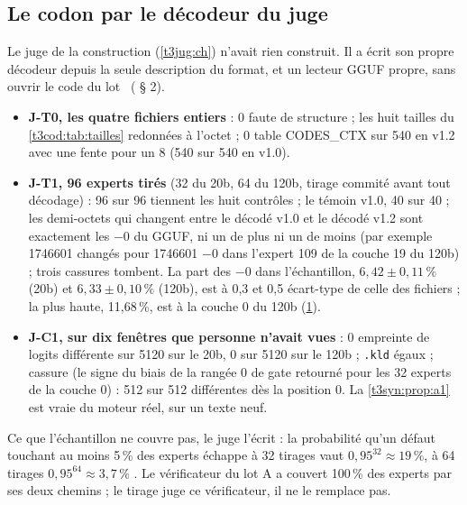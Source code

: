 \subsection{Le codon par le décodeur du juge}

Le juge de la construction (\cref{t3jug:ch}) n'avait rien construit. Il a écrit son propre décodeur depuis la seule description du format, et un lecteur GGUF propre, sans ouvrir le code du lot \mes~( § 2).

\begin{figure}[tbp]
\centering
\GrapheJconsCodon
{}
\label{fig:t3-jcons-codon}
\end{figure}

\begin{itemize}
\item \textbf{J-T0, les quatre fichiers entiers} : 0 faute de structure ; les huit tailles du \cref{t3cod:tab:tailles} redonnées à l'octet ; 0 table CODES\_CTX sur 540 en v1.2 avec une fente pour un 8 (540 sur 540 en v1.0).
\item \textbf{J-T1, 96 experts tirés} (32 du 20b, 64 du 120b, tirage commité avant tout décodage) : 96 sur 96 tiennent les huit contrôles ; le témoin v1.0, 40 sur 40 ; les demi-octets qui changent entre le décodé v1.0 et le décodé v1.2 sont exactement les $-0$ du GGUF, ni un de plus ni un de moins (par exemple \num{1746601} changés pour \num{1746601} $-0$ dans l'expert 109 de la couche 19 du 120b) ; trois cassures tombent. La part des $-0$ dans l'échantillon, $6{,}42 \pm 0{,}11\,\%$ (20b) et $6{,}33 \pm 0{,}10\,\%$ (120b), est à 0,3 et 0,5 écart-type de celle des fichiers ; la plus haute, 11,68\,\%, est à la couche 0 du 120b (\cref{fig:t3-jcons-codon}).
\item \textbf{J-C1, sur dix fenêtres que personne n'avait vues} : 0 empreinte de logits différente sur \num{5120} sur le 20b, 0 sur \num{5120} sur le 120b ; \texttt{.kld} égaux ; cassure (le signe du biais de la rangée 0 de gate retourné pour les 32 experts de la couche 0) : 512 sur 512 différentes dès la position 0. La \cref{t3syn:prop:a1} est vraie du moteur réel, sur un texte neuf.
\end{itemize}

Ce que l'échantillon ne couvre pas, le juge l'écrit : la probabilité qu'un défaut touchant au moins 5\,\% des experts échappe à 32 tirages vaut $0{,}95^{32} \approx 19\,\%$, à 64 tirages $0{,}95^{64} \approx 3{,}7\,\%$ \calc. Le vérificateur du lot A a couvert 100\,\% des experts par ses deux chemins ; le tirage juge ce vérificateur, il ne le remplace pas.

